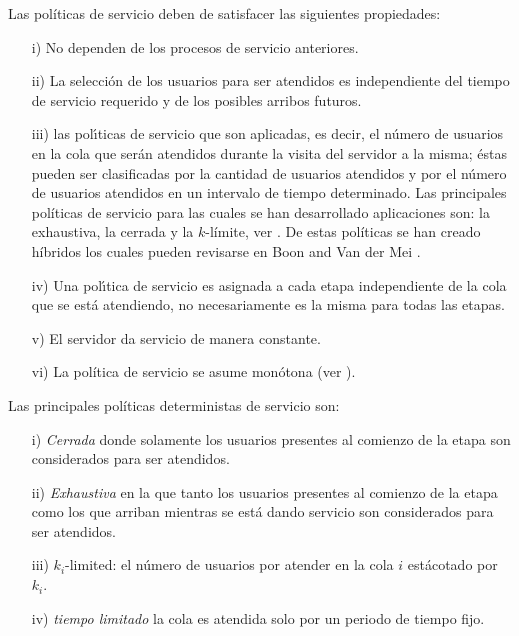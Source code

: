\documentclass{article}
\numberwithin{equation}{section}
\begin{document}
Las pol\'iticas de servicio deben de satisfacer las siguientes propiedades:
\begin{itemize}
\item[i)] No dependen de los procesos de servicio anteriores.
\item[ii)] La selecci\'on de los usuarios para ser atendidos es independiente del tiempo de servicio requerido  y de los posibles arribos futuros.
\item[iii)] las pol{\'\i}ticas de servicio que son aplicadas, es decir, el n\'umero de usuarios en la cola que ser{\'a}n atendidos durante la visita del servidor a la misma; \'estas pueden ser clasificadas por la cantidad de usuarios atendidos y por el n\'umero de usuarios atendidos en un intervalo de tiempo determinado. Las principales pol\'iticas de servicio para las cuales se han desarrollado aplicaciones son: la exhaustiva, la cerrada y la $k$-l\'imite, ver \cite{LevySidi, TakagiI, Semenova}. De estas pol\'iticas se han creado h\'ibridos los cuales pueden revisarse en Boon and Van der Mei \cite{BoonMeiWinands}.

\item[iv)] Una pol{\'\i}tica de servicio es asignada a cada etapa independiente de la cola que se est{\'a} atendiendo, no necesariamente es la misma para todas las etapas.
\item[v)] El servidor da servicio de manera constante.

\item[vi)] La pol\'itica de servicio se asume mon\'otona (ver
\cite{Stability}).

\end{itemize}

Las principales pol\'iticas deterministas de servicio son:
\begin{itemize}

\item[i)] {\em Cerrada} donde solamente los usuarios presentes al comienzo de la etapa son considerados para ser atendidos.

\item[ii)] {\em Exhaustiva} en la que tanto los usuarios presentes al comienzo de la etapa como los que arriban   mientras se est\'a dando servicio son considerados para ser atendidos.

\item[iii)] $k_{i}$-limited: el n\'umero de usuarios por atender en la cola $i$ est\' acotado por $k_{i}$.

\item[iv)] {\em tiempo limitado} la cola es atendida solo por un periodo de tiempo fijo.
\end{itemize}
\end{document}
